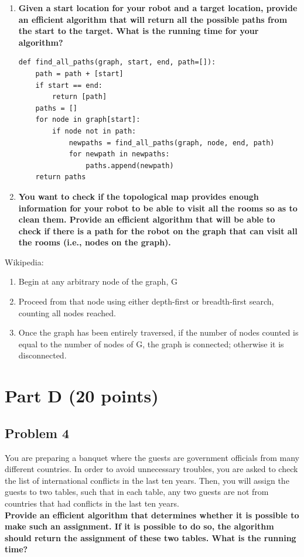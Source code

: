 \documentclass[11pt]{article}
\begin{document}
\begin{enumerate}[label=\Alph*.]

\item \textbf{Given a start location for your robot and a target
location, provide an efficient algorithm that will return all the
possible paths from the start to the target.  What is the running time
for your algorithm?}

\begin{verbatim}
def find_all_paths(graph, start, end, path=[]):
    path = path + [start]
    if start == end:
        return [path]
    paths = []
    for node in graph[start]:
        if node not in path:
            newpaths = find_all_paths(graph, node, end, path)
            for newpath in newpaths:
                paths.append(newpath)
    return paths 
\end{verbatim}

\item \textbf{You want to check if the topological map provides
enough information for your robot to be able to visit all the rooms so
as to clean them. Provide an efficient algorithm that will be able to
check if there is a path for the robot on the graph that can visit all
the rooms (i.e., nodes on the graph).}
\end{enumerate}

Wikipedia:
\begin{enumerate}
\item Begin at any arbitrary node of the graph, G
\item Proceed from that node using either depth-first or breadth-first search, counting all nodes reached.
\item Once the graph has been entirely traversed, if the number of nodes counted is equal to the number of nodes of G, the graph is connected; otherwise it is disconnected.
\end{enumerate}
\section*{Part D (20 points)}

\subsection*{Problem 4} You are preparing a banquet where the
guests are government officials from many different countries. In
order to avoid unnecessary troubles, you are asked to check the list
of international conflicts in the last ten years. Then, you will
assign the guests to two tables, such that in each table, any two
guests are not from countries that had conflicts in the last ten
years.\\

\noindent \textbf{Provide an efficient algorithm that determines whether it is
possible to make such an assignment. If it is possible to do so, the
algorithm should return the assignment of these two tables. What is
the running time?}
\end{document}
